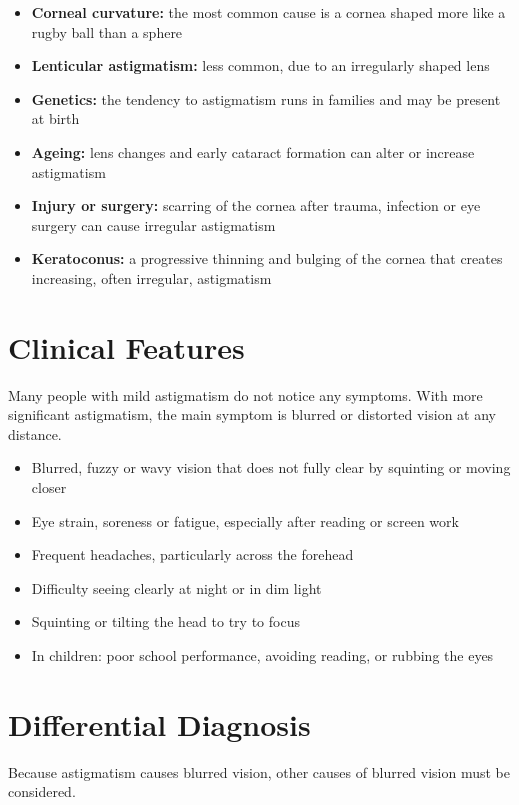 \begin{itemize}
    \item \textbf{Corneal curvature:} the most common cause is a cornea shaped more like a rugby ball than a sphere
    \item \textbf{Lenticular astigmatism:} less common, due to an irregularly shaped lens
    \item \textbf{Genetics:} the tendency to astigmatism runs in families and may be present at birth
    \item \textbf{Ageing:} lens changes and early cataract formation can alter or increase astigmatism
    \item \textbf{Injury or surgery:} scarring of the cornea after trauma, infection or eye surgery can cause irregular astigmatism
    \item \textbf{Keratoconus:} a progressive thinning and bulging of the cornea that creates increasing, often irregular, astigmatism
\end{itemize}

\section*{Clinical Features}
Many people with mild astigmatism do not notice any symptoms. With more significant astigmatism, the main symptom is blurred or distorted vision at any distance.

\begin{itemize}
    \item Blurred, fuzzy or wavy vision that does not fully clear by squinting or moving closer
    \item Eye strain, soreness or fatigue, especially after reading or screen work
    \item Frequent headaches, particularly across the forehead
    \item Difficulty seeing clearly at night or in dim light
    \item Squinting or tilting the head to try to focus
    \item In children: poor school performance, avoiding reading, or rubbing the eyes
\end{itemize}

\section*{Differential Diagnosis}
Because astigmatism causes blurred vision, other causes of blurred vision must be considered.

